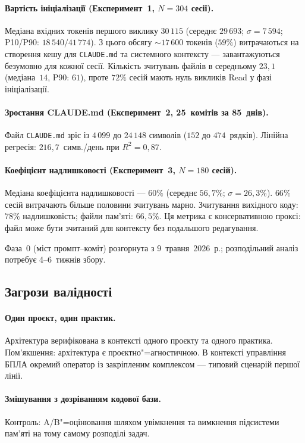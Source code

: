 \documentclass[11pt]{article}
\begin{document}
\paragraph{Вартість ініціалізації (Експеримент~1, $N{=}304$ сесії).}
Медіана вхідних токенів першого виклику $30\,115$ (середнє $29\,693$; $\sigma{=}7\,594$; P10/P90: $18\,540/41\,774$).
З цього обсягу ${\sim}17\,600$ токенів ($59\%$) витрачаються на створення кешу для \texttt{CLAUDE.md} та системного контексту --- завантажуються безумовно для кожної сесії.
Кількість зчитувань файлів в середньому $23{,}1$ (медіана~$14$, P90: $61$), проте $72\%$ сесій мають нуль викликів Read у фазі ініціалізації.

\paragraph{Зростання CLAUDE.md (Експеримент~2, 25~комітів за 85~днів).}
Файл \texttt{CLAUDE.md} зріс із $4\,099$ до $24\,148$ символів ($152$ до $474$~рядків).
Лінійна регресія: $216{,}7$~симв./день при $R^2 = 0{,}87$.

\paragraph{Коефіцієнт надлишковості (Експеримент~3, $N{=}180$ сесій).}
Медіана коефіцієнта надлишковості --- $60\%$ (середнє $56{,}7\%$; $\sigma{=}26{,}3\%$).
$66\%$ сесій витрачають більше половини зчитувань марно.
Зчитування вихідного коду: $78\%$ надлишковість; файли пам'яті: $66{,}5\%$.
Ця метрика є консервативною проксі: файл може бути зчитаний для контексту без подальшого редагування.

Фаза~0 (міст промпт--коміт) розгорнута з 9~травня~2026~р.; розподільний аналіз потребує 4--6~тижнів збору.

\subsection{Загрози валідності}
\label{sec:threats}

\paragraph{Один проєкт, один практик.}
Архітектура верифікована в контексті одного проєкту та одного практика.
Пом'якшення: архітектура є проєктно"=агностичною.
В контексті управління БПЛА окремий оператор із закріпленим комплексом --- типовий сценарій першої лінії.

\paragraph{Змішування з дозріванням кодової бази.}
Контроль: A/B"=оцінювання шляхом увімкнення та вимкнення підсистеми пам'яті на тому самому розподілі задач.
\end{document}
